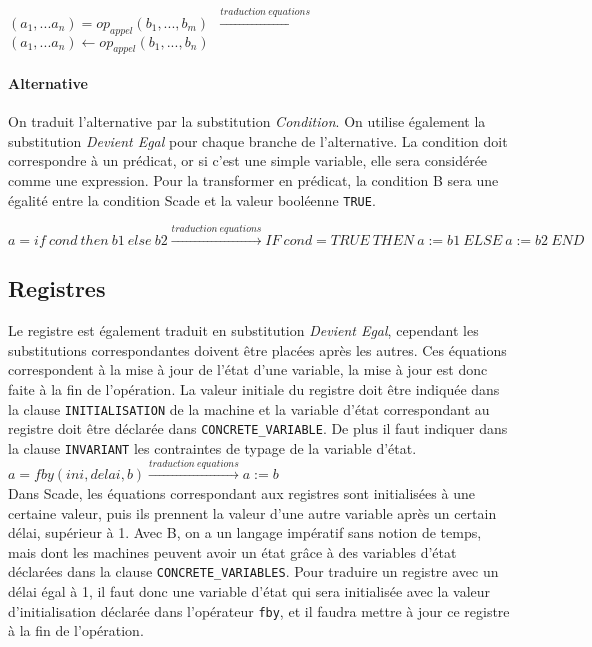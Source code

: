 \texttt{$(a_1, ... a_n) = op_{appel}(b_1, ..., b_m)$
$\xrightarrow{traduction ~ equations}$ $(a_1, ... a_n) \leftarrow
op_{appel}(b_1,..., b_n)$} 

\paragraph{Alternative}
On traduit l'alternative par la substitution \emph{Condition}. On utilise
également la substitution \emph{Devient Egal} pour chaque branche de
l'alternative.
La condition doit correspondre à un prédicat, or si c'est une simple variable,
elle sera considérée comme une expression. Pour la transformer en prédicat, la
condition B sera une égalité entre la condition Scade et la valeur
booléenne \texttt{TRUE}.

\noindent
\begin{small}
\texttt{$ a=if~cond~then~b1~else~b2\xrightarrow{traduction~equations}IF~cond=TRUE~THEN~a:=b1~ELSE~a:=b2~END$}
\end{small}
\subsection*{Registres}

Le registre est également traduit en substitution \emph{Devient Egal}, cependant
les substitutions correspondantes doivent être placées après les autres. Ces
équations correspondent à la mise à jour de l'état d'une variable, la mise à
jour est donc faite à la fin de l'opération. La valeur initiale du registre doit
être indiquée dans la clause \texttt{INITIALISATION} de la machine et la variable d'état
correspondant au registre doit être déclarée dans \texttt{CONCRETE\_VARIABLE}. De
plus il faut indiquer dans la clause \texttt{INVARIANT} les contraintes de typage
de la variable d'état. \\

\texttt{$a = fby(ini, delai, b) \xrightarrow{traduction ~ equations} a := b$ }\\

Dans Scade, les équations correspondant aux registres sont initialisées à une
certaine valeur, puis ils prennent la valeur d'une autre variable après un
certain délai, supérieur à 1.
Avec B, on a un langage impératif sans notion de temps, mais dont les machines
peuvent avoir un état grâce à des variables d'état déclarées dans la
clause \texttt{CONCRETE\_VARIABLES}. Pour traduire un registre avec un délai égal
à 1, il faut donc une variable d'état qui sera initialisée avec la valeur
d'initialisation déclarée dans l'opérateur \texttt{fby}, et il faudra mettre à
jour ce registre à la fin de l'opération.

